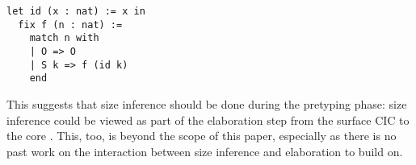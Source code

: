 \begin{verbatim}
let id (x : nat) := x in
  fix f (n : nat) :=
    match n with
    | O => O
    | S k => f (id k)
    end
\end{verbatim}

This suggests that size inference should be done during the pretyping phase:
size inference could be viewed as part of the elaboration step from the surface CIC to the core \lang.
This, too, is beyond the scope of this paper, especially as there is no past work on the interaction between size inference and elaboration to build on.
